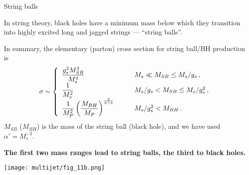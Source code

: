 \documentclass[8pt]{beamer}
\begin{document}
\begin{frame}{\large String balls}

In string theory, black holes have a minimum mass below which they
transition into highly excited long and jagged strings  --- ``string
balls''.
\vspace{0.2cm}

In summary, the elementary (parton) cross section for string ball/BH
production is
\begin{eqnarray}
\sigma\sim\left\{
\begin{array}{ll}
\displaystyle 
{g_s^2 M_{SB}^2\over M_s^4} &\qquad M_s\ll M_{SB}\leq M_s/ g_s\,,\\
\displaystyle 
{1\over M_s^{2}}&\qquad M_s/ g_s< M_{SB}\leq M_s/ g_s^2\,,\\
\displaystyle
{1\over M_P^{2}}\left({M_{BH}\over M_P}\right)^{2\over n+1} 
&\qquad M_s/ g_s^2<M_{BH}\,.
\end{array}
\right.
\end{eqnarray}
$M_{SB}$ ($M_{BH}$) is the mass of the string ball (black hole), and we
have used $\alpha'=M_s^{-2}$.

\textbf{
The first two mass ranges lead to string balls, the third to black
holes. }

\vspace{0.1cm}
{\centering
 \texttt{[image: multijet/fig\_11b.png]}\\
}


\end{frame}
\end{document}
